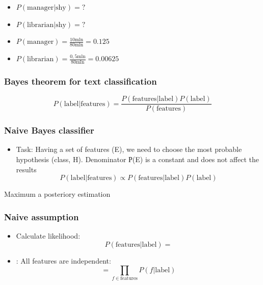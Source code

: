 \documentclass[svgnames]{beamer}
\begin{document}
\begin{frame}[standout]
  \begin{itemize}
  \item $P(\text{manager|shy}) = ?$
  \item $P(\text{librarian|shy}) = ?$
  \end{itemize}
\end{frame}

\begin{frame}[standout]
  \begin{itemize}
  \item $P(\text{manager}) = \frac{10 \text{mln}}{80 \text{mln}} = 0.125$
  \item $P(\text{librarian}) = \frac{0,5 \text{mln}}{80
      \text{mln}} = 0.00625$
  \end{itemize}
\end{frame}


\begin{frame}
  \frametitle{Bayes theorem for text classification}
\begin{equation}
    P(\text{label}|\text{features}) = \frac{P(\text{features}|\text{label})P(\text{label})}{P(\text{features})}
  \end{equation}
\end{frame}

\begin{frame}
  \frametitle{Naive Bayes classifier}
  \begin{itemize}
  \item Task:  Having a set of features (E), we need to choose the most probable hypothesis
    (class, H). Denominator Р(E) is a constant and does not affect the results
  $$
   P(\text{label}|\text{features}) \propto P(\text{features}|\text{label}) P(\text{label})
   $$
   \end{itemize}
   \alert{Maximum a posteriory estimation}
\end{frame}

\begin{frame}
  \frametitle{Naive assumption}
\begin{itemize}
 \item Calculate likelihood:
   $$
   P(\text{features}|\text{label}) = 
   $$
 \item {}: All features are independent:
   $$
   = \prod_{f \in \text{features}} P(f|\text{label})
   $$
 \end{itemize}
\end{frame}
\end{document}
